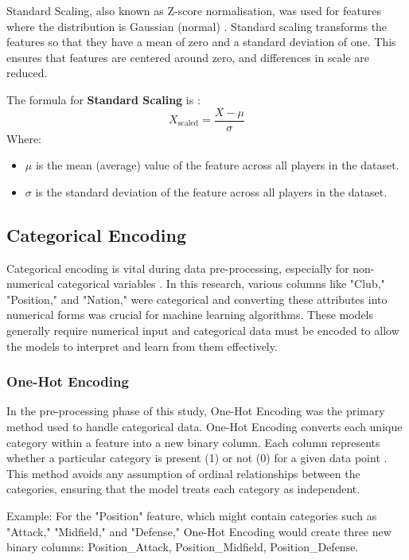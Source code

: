 \documentclass[12pt, a4paper,oneside]{book}
\numberwithin{equation}{section}
\begin{document}
Standard Scaling, also known as Z-score normalisation, was used for features where the distribution is Gaussian (normal) \cite{jain2017}. Standard scaling transforms the features so that they have a mean of zero and a standard deviation of one. This ensures that features are centered around zero, and differences in scale are reduced.

The formula for \textbf{Standard Scaling} is \cite{mehta2020}:
\[X_{\text{scaled}} = \frac{X - \mu}{\sigma}\]
Where:
\begin{itemize}
    \item \textbf{$\mu$} is the mean (average) value of the feature across all players in the dataset.
    \item \textbf{$\sigma$} is the standard deviation of the feature across all players in the dataset.
\end{itemize}

\subsection{Categorical Encoding}\label{sec:3.1.3}

Categorical encoding is vital during data pre-processing, especially for non-numerical categorical variables \cite{hasan2019}. In this research, various columns like "Club," "Position," and "Nation," were categorical and converting these attributes into numerical forms was crucial for machine learning algorithms. These models generally require numerical input and categorical data must be encoded to allow the models to interpret and learn from them effectively.

\subsubsection{One-Hot Encoding}

In the pre-processing phase of this study, One-Hot Encoding was the primary method used to handle categorical data. One-Hot Encoding converts each unique category within a feature into a new binary column. Each column represents whether a particular category is present (1) or not (0) for a given data point \cite{ng2021}. This method avoids any assumption of ordinal relationships between the categories, ensuring that the model treats each category as independent.

Example: For the "Position" feature, which might contain categories such as "Attack," "Midfield," and "Defense," One-Hot Encoding would create three new binary columns: Position\_Attack, Position\_Midfield, Position\_Defense.
\end{document}
